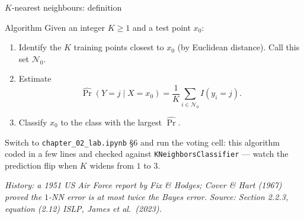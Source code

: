\documentclass[aspectratio=169,11pt]{beamer}
\newcommand{\islpsource}[1]{%
  \vfill\hfill{\tiny\itshape\color{gray}Source: #1 \textemdash{} ISLP, James et al.\ (2023).}\par
}
\begin{document}
\begin{frame}{$K$-nearest neighbours: definition}
  \begin{block}{Algorithm}
    Given an integer $K \ge 1$ and a test point $x_0$:
    \begin{enumerate}
      \item Identify the $K$ training points closest to $x_0$ (by
            Euclidean distance). Call this set $\mathcal{N}_0$.
      \item Estimate
            \[
              \hat \Pr(Y = j \mid X = x_0)
              = \frac{1}{K}\sum_{i \in \mathcal{N}_0} I(y_i = j).
            \]
      \item Classify $x_0$ to the class with the largest $\hat\Pr$.
    \end{enumerate}
  \end{block}
  \begin{labnote}
    Switch to \texttt{chapter\_02\_lab.ipynb} \S6 and run the voting cell: this algorithm coded
    in a few lines and checked against \texttt{KNeighborsClassifier} --- watch the prediction
    flip when $K$ widens from $1$ to $3$.
  \end{labnote}
  \par{\tiny\itshape\color{gray}History: a 1951 US Air Force report by Fix \&
  Hodges; Cover \& Hart (1967) proved the $1$-NN error is at most twice the
  Bayes error.}
  \islpsource{Section 2.2.3, equation (2.12)}
\end{frame}
\end{document}
